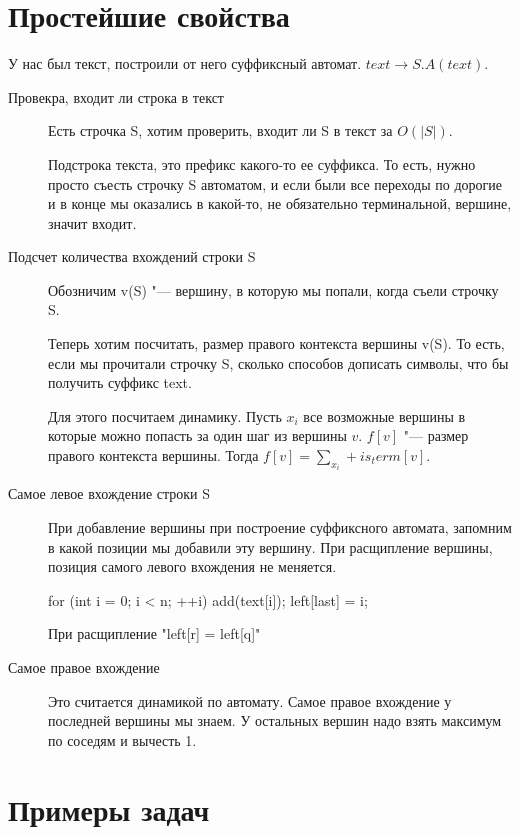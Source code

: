 ﻿\date{September 22, 2016}
\author{Chernikova Olga}

\section{Простейшие свойства}
У нас был текст, построили от него суффиксный автомат. $text \to S.A(text)$.
\begin{description}
\item[Провекра, входит ли строка в текст]
    Есть строчка S, хотим проверить, входит ли S в текст за $O(|S|)$.

    Подстрока текста, это префикс какого-то ее суффикса. То есть, нужно просто 
    съесть строчку S автоматом, и если были все переходы по дорогие и в конце мы 
    оказались в какой-то, не обязательно терминальной, вершине, значит входит.

\item[Подсчет количества вхождений строки S]
    Обозничим v(S) "--- вершину, в которую мы попали, когда съели строчку S.

    Теперь хотим посчитать, размер правого контекста вершины v(S). То есть, 
    если мы прочитали строчку S, сколько способов дописать символы, что бы 
    получить суффикс text. 

    Для этого посчитаем динамику. Пусть $x_i$ все возможные вершины в которые 
    можно попасть за один шаг из вершины $v$. $f[v]$ "--- размер правого контекста вершины. 
    Тогда $f[v] = \sum_{x_i} + is_term[v]$.
\item[Самое левое вхождение строки S]
    При добавление вершины при построение суффиксного автомата,
    запомним в какой позиции мы добавили эту вершину. При расщипление
    вершины, позиция самого левого вхождения не меняется.

    \begin{cppcode}
    for (int i = 0; i < n; ++i) {
        add(text[i]);
        left[last] = i;
    }
    \end{cppcode}

    При расщипление \cpp"left[r] = left[q]"
\item[Самое правое вхождение]
    Это считается динамикой по автомату. Самое правое вхождение у
    последней вершины мы знаем. У остальных вершин надо взять максимум по соседям и вычесть 1. 
\end{description}

\section{Примеры задач}
